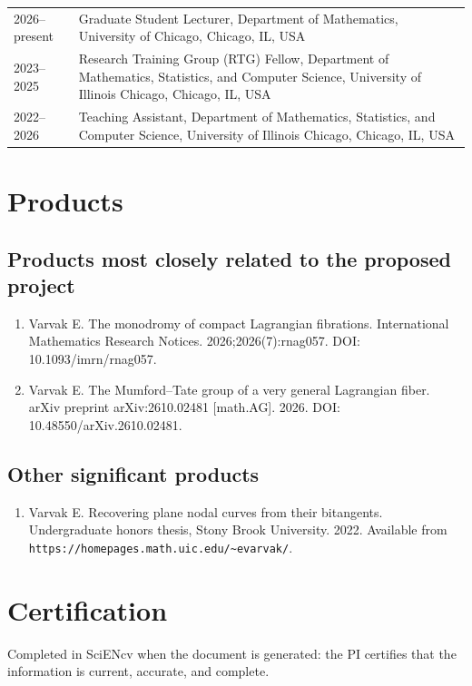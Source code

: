 \documentclass[11pt]{article}
\begin{document}
\begin{tabularx}{\textwidth}{@{}lX@{}}
2026--present & Graduate Student Lecturer, Department of Mathematics, University of Chicago,
Chicago, IL, USA \\
2023--2025 & Research Training Group (RTG) Fellow, Department of Mathematics, Statistics,
and Computer Science, University of Illinois Chicago, Chicago, IL, USA \\
2022--2026 & Teaching Assistant, Department of Mathematics, Statistics, and Computer
Science, University of Illinois Chicago, Chicago, IL, USA \\
\end{tabularx}

\section*{Products}

\subsection*{Products most closely related to the proposed project}

\begin{enumerate}
  \item Varvak E. The monodromy of compact Lagrangian fibrations. International Mathematics
  Research Notices. 2026;2026(7):rnag057. DOI: 10.1093/imrn/rnag057.
  \item Varvak E. The Mumford--Tate group of a very general Lagrangian fiber. arXiv preprint
  arXiv:2610.02481 [math.AG]. 2026. DOI: 10.48550/arXiv.2610.02481.
\end{enumerate}

\subsection*{Other significant products}

\begin{enumerate}
  \item Varvak E. Recovering plane nodal curves from their bitangents. Undergraduate honors
  thesis, Stony Brook University. 2022. Available from
  \texttt{https://homepages.math.uic.edu/{\textasciitilde}evarvak/}.
\end{enumerate}

\section*{Certification}

Completed in SciENcv when the document is generated: the PI certifies that the information
is current, accurate, and complete.
\end{document}
